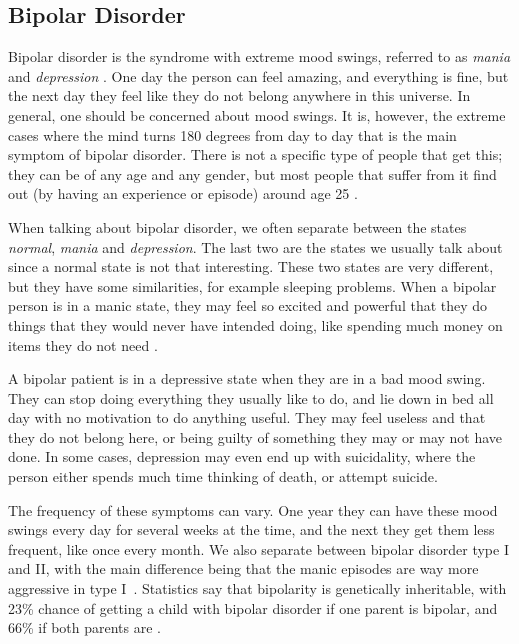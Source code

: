 \subsection{Bipolar Disorder}

Bipolar disorder is the syndrome with extreme mood swings, referred to as \emph{mania} and \emph{depression} \cite{bipolar_disorder}. One day the person can feel amazing, and everything is fine, 
but the next day they feel like they do not belong anywhere in this universe. In general, one should be concerned about mood swings. 
It is, however, the extreme cases where the mind turns 180 degrees from day to day that is the main symptom of bipolar disorder. 
There is not a specific type of people that get this; they can be of any age and any gender, but most people that suffer from it find out 
(by having an experience or episode) around age 25 \cite{bipolar_statistics}. 

When talking about bipolar disorder, we often separate between the states \emph{normal}, \emph{mania} and \emph{depression}. 
The last two are the states we usually talk about since a normal state is not that interesting. These two states are very different, 
but they have some similarities, for example sleeping problems. When a bipolar person is in a manic state, they may feel so excited and powerful that they do things that they would never have intended doing, like spending much money on items they do 
not need \cite{bipolar_disorder}.

A bipolar patient is in a depressive state when they are in a bad mood swing. They can stop doing everything they usually like to do, 
and lie down in bed all day with no motivation to do anything useful. They may feel useless and that they do not belong here, 
or being guilty of something they may or may not have done. In some cases, depression may even end up with suicidality, 
where the person either spends much time thinking of death, or attempt suicide.

The frequency of these symptoms can vary. One year they can have these mood swings every day for several weeks at the time, and the next they get them less frequent, 
like once every month. We also separate between bipolar disorder type I and II, with the main difference being that the manic episodes are way 
more aggressive in type I \cite{bipolar_types}. Statistics say that bipolarity is genetically inheritable, with 23\% chance of getting a child with bipolar 
disorder if one parent is bipolar, and 66\% if both parents are \cite{bipolar_statistics}. 

